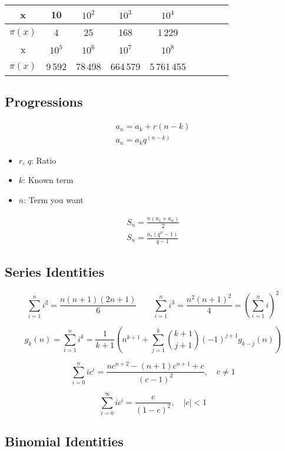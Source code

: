 \documentclass[a4paper]{article}
\begin{document}
\begin{table}[ht]
  \centering
  \begin{tabular}{|c|c|c|c|c|c|c|c|c|}
  \hline
    \rowcolor{gray!40}
    x&10&$10^2$&$10^3$&$10^4$\\ \hline
    $\pi(x)$& 4 & 25 & 168 & 1\,229 \\ \hline
    \rowcolor{gray!40}
    x&$10^5$&$10^6$&$10^7$&$10^8$\\ \hline
    $\pi(x)$& 9\,592 & 78\,498 & 664\,579 & 5\,761\,455\\ \hline
  \end{tabular}
\end{table}


\subsection{Progressions}
\begin{align*}
  a_n = a_k + r(n - k) \\
  a_n = a_k q^{(n-k)}
\end{align*}
\begin{itemize}
  \item $r$, $q$: Ratio
  \item $k$: Known term
  \item $n$: Term you want
\end{itemize}
\begin{align*}
  S_n = \frac{n(a_1 + a_n)}{2} \\
  S_n = \frac{a_1(q^n - 1)}{q-1}
\end{align*}

\subsection{Series Identities}
$$\sum_{i=1}^{n} i^{2} = \frac{n(n+1)(2n+1)}{6}  \qquad  \sum_{i=1}^{n} i^{3} = \frac{n^{2}(n+1)^{2}}{4} = \left(\sum_{i=1}^n i\right)^2$$

$$ g_k(n) = \sum_{i=1}^n i^k = \frac{1}{k+1} \left( n^{k+1} + \sum_{j=1}^k \binom{k+1}{j+1} (-1)^{j+1} g_{k-j}(n) \right) $$

$$\sum_{i=0}^{n} ic^{i} = \frac{nc^{n+2} - (n+1)c^{n+1} + c}{(c-1)^{2}}, \quad c \neq 1$$

$$\sum_{i=0}^{\infty} ic^{i} = \frac{c}{(1-c)^{2}}, \quad |c| < 1$$

\subsection{Binomial Identities}
\end{document}
